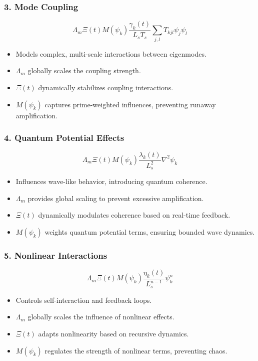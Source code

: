 \documentclass[12pt]{article}
\theoremstyle{plain}
\begin{document}
\subsubsection{3. Mode Coupling}

\[
\Lambda_m \Xi(t) M(\psi_k) \frac{\gamma_k(t)}{L_s T_s} \sum_{j,l} T_{kjl} \psi_j \psi_l
\]

\begin{itemize}
    \item Models complex, multi-scale interactions between eigenmodes.
    \item \( \Lambda_m \) globally scales the coupling strength.
    \item \( \Xi(t) \) dynamically stabilizes coupling interactions.
    \item \( M(\psi_k) \) captures prime-weighted influences, preventing runaway amplification.
\end{itemize}

\subsubsection{4. Quantum Potential Effects}

\[
\Lambda_m \Xi(t) M(\psi_k) \frac{\lambda_k(t)}{L_s^2} \nabla^2 \psi_k
\]

\begin{itemize}
    \item Influences wave-like behavior, introducing quantum coherence.
    \item \( \Lambda_m \) provides global scaling to prevent excessive amplification.
    \item \( \Xi(t) \) dynamically modulates coherence based on real-time feedback.
    \item \( M(\psi_k) \) weights quantum potential terms, ensuring bounded wave dynamics.
\end{itemize}

\subsubsection{5. Nonlinear Interactions}

\[
\Lambda_m \Xi(t) M(\psi_k) \frac{\eta_k(t)}{L_s^{n-1}} \psi_k^n
\]

\begin{itemize}
    \item Controls self-interaction and feedback loops.
    \item \( \Lambda_m \) globally scales the influence of nonlinear effects.
    \item \( \Xi(t) \) adapts nonlinearity based on recursive dynamics.
    \item \( M(\psi_k) \) regulates the strength of nonlinear terms, preventing chaos.
\end{itemize}
\end{document}
